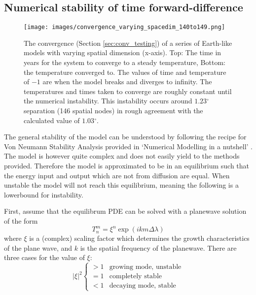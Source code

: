 \documentclass[12pt, onecolumn]{revtex4-2}    %
\newcommand{\degrees}{\ensuremath{^{\circ}}}
\begin{document}
\subsection{Numerical stability of time forward-difference} \label{sec:numerical_stability}

\begin{figure}[ht]
    \texttt{[image: images/convergence\_varying\_spacedim\_140to149.png]}
    \caption{The convergence (Section \ref{sec:conv_testing}) of a series of Earth-like models with varying spatial dimension (x-axis). Top: The time in years for the system to converge to a steady temperature, Bottom: the temperature converged to.
        The values of time and temperature of $-1$ are when the model breaks and diverges to infinity.
        The temperatures and times taken to converge are roughly constant until the numerical instability.
        This instability occurs around $1.23\degrees$ separation (146 spatial nodes) in rough agreement with the calculated value of $1.03\degrees$.}
    \label{fig:conv_spacedim}
\end{figure}

The general stability of the model can be understood by following the recipe for Von Neumann Stability Analysis provided in `Numerical Modelling in a nutshell' \cite{NumericalModelling}.
The model is however quite complex and does not easily yield to the methods provided.
Therefore the model is approximated to be in an equilibrium such that the energy input and output which are not from diffusion are equal.
When unstable the model will not reach this equilibrium, meaning the following is a lowerbound for instability.

First, assume that the equilibrum PDE can be solved with a planewave solution of the form
\begin{equation} \label{eq:trial_plane_wave}
    T^m_n = \xi^n \exp{(i k m \Delta\lambda)}
\end{equation}
where $\xi$ is a (complex) scaling factor which determines the growth characteristics of the plane wave, and $k$ is the spatial frequency of the planewave.
There are three cases for the value of $\xi$:
\begin{equation}\label{eq:stability_cases}
    |\xi|^2
    \begin{cases}
        > 1 & \text{growing mode, unstable} \\
        = 1 & \text{completely stable}      \\
        < 1 & \text{decaying mode, stable}
    \end{cases}
\end{equation}
\end{document}
